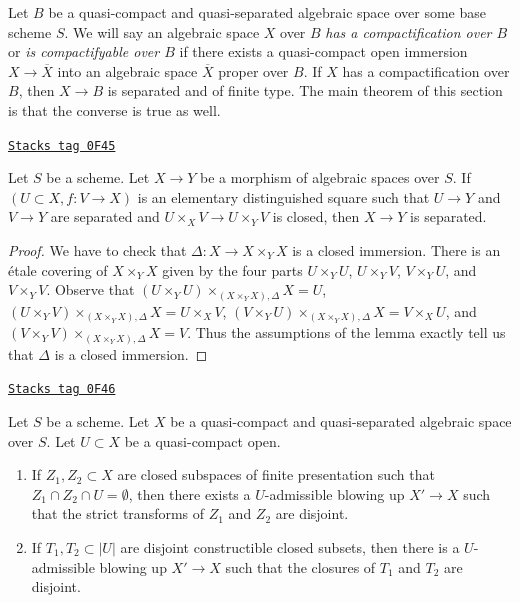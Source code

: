 \medskip\noindent
Let $B$ be a quasi-compact and quasi-separated algebraic space over
some base scheme $S$. We will say an algebraic space $X$ over $B$
{\it has a compactification over $B$} or {\it is compactifyable over $B$}
if there exists a quasi-compact open immersion $X \to \overline{X}$
into an algebraic space $\overline{X}$ proper over $B$. If $X$
has a compactification over $B$, then $X \to B$ is separated and
of finite type. The main theorem of this section is that the converse
is true as well.

\begin{lemma}
\label{spaces-pushouts-lemma-check-separated}
\href{https://stacks.math.columbia.edu/tag/0F45}{\texttt{Stacks tag 0F45}}

Let $S$ be a scheme. Let $X \to Y$ be a morphism of algebraic spaces over $S$.
If $(U \subset X, f : V \to X)$ is an elementary distinguished square
such that $U \to Y$ and $V \to Y$ are separated and
$U \times_X V \to U \times_Y V$ is closed, then $X \to Y$ is separated.
\end{lemma}

\begin{proof}
We have to check that $\Delta : X \to X \times_Y X$ is a closed immersion.
There is an \'etale covering of $X \times_Y X$ given by the four parts
$U \times_Y U$, $U \times_Y V$, $V \times_Y U$, and $V \times_Y V$.
Observe that
$(U \times_Y U) \times_{(X \times_Y X), \Delta} X  = U$,
$(U \times_Y V) \times_{(X \times_Y X), \Delta} X = U \times_X V$,
$(V \times_Y U) \times_{(X \times_Y X), \Delta} X = V \times_X U$, and
$(V \times_Y V) \times_{(X \times_Y X), \Delta} X = V$.
Thus the assumptions of the lemma
exactly tell us that $\Delta$ is a closed immersion.
\end{proof}

\begin{lemma}
\label{spaces-pushouts-lemma-separate-disjoint-locally-closed-by-blowing-up}
\href{https://stacks.math.columbia.edu/tag/0F46}{\texttt{Stacks tag 0F46}}

Let $S$ be a scheme.
Let $X$ be a quasi-compact and quasi-separated algebraic space over $S$.
Let $U \subset X$ be a quasi-compact open.
\begin{enumerate}
\item If $Z_1, Z_2 \subset X$ are closed subspaces of finite
presentation such that $Z_1 \cap Z_2 \cap U = \emptyset$, then
there exists a $U$-admissible blowing up $X' \to X$
such that the strict transforms of $Z_1$ and $Z_2$ are disjoint.
\item If $T_1, T_2 \subset |U|$ are disjoint constructible closed
subsets, then there is a $U$-admissible blowing up $X' \to X$
such that the closures of $T_1$ and $T_2$ are disjoint.
\end{enumerate}
\end{lemma}

